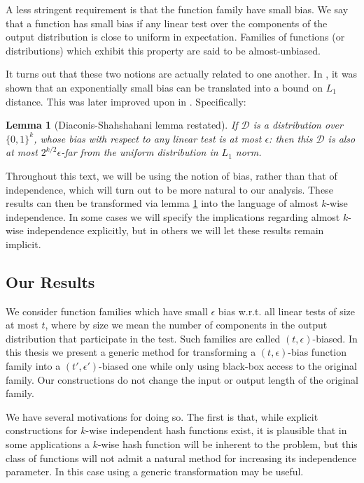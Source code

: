 \documentclass[12pt]{article}
\newtheorem{lemma}[theorem]{Lemma}
\newcommand{\dist}{\mathcal{D}}
\begin{document}
	A less stringent requirement is that the function family have small bias.
	We say that a function has small bias if any linear test over the components of the output distribution is close to uniform in expectation.
	Families of functions (or distributions) which exhibit this property are said to be almost-unbiased.
	
	It turns out that these two notions are actually related to one another.
	In \cite{VaziraniBias}, it was shown that an exponentially small bias can be translated into a bound on $L_1$ distance.
	This was later improved upon in \cite{DiaconisBias}. Specifically:
	\begin{lemma}[Diaconis-Shahshahani lemma restated] \label{lemma: diaconis bias}
		If $\dist$ is a distribution over $\{0,1\}^k$, whose bias with respect to any linear test is at most $\epsilon$: then this $\dist$ is also at most $2^{k/2} \epsilon$-far from the uniform distribution in $L_1$ norm.
	\end{lemma}
	
	Throughout this text, we will be using the notion of bias, rather than that of independence, which will turn out to be more natural to our analysis.
	These results can then be transformed via lemma \ref{lemma: diaconis bias} into the language of almost $k$-wise independence.
	In some cases we will specify the implications regarding almost $k$-wise independence explicitly, but in others we will let these results remain implicit. 
	
	\subsection{Our Results}
	
	We consider function families which have small $\epsilon$ bias w.r.t. all linear tests of size at most $t$, where by size we mean the number of components in the output distribution that participate in the test.
	Such families are called $(t, \epsilon)$-biased.
	In this thesis we present a generic method for transforming a $(t, \epsilon)$-bias function family into a $(t', \epsilon')$-biased one while only using black-box access to the original family.
	Our constructions do not change the input or output length of the original family.
	
	We have several motivations for doing so.
	The first is that, while explicit constructions for $k$-wise independent hash functions exist, it is plausible that in some applications a $k$-wise hash function will be inherent to the problem, but this class of functions will not admit a natural method for increasing its independence parameter.
	In this case using a generic transformation may be useful.
	
\end{document}

